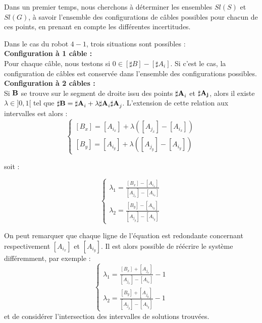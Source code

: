Dans un premier temps, nous cherchons \`a d\'eterminer les ensembles $Sl(S)$ et 
$Sl(G)$, \`a savoir l'ensemble des configurations de c\^ables possibles pour 
chacun de ces points, en prenant en compte les diff\'erentes incertitudes.

Dans le cas du robot $4-1$, trois situations sont possibles : \\

{\bf Configuration \`a 1 c\^able :}\\

Pour chaque c\^able, nous testons si $0 \in [\sharp B] - [\sharp A_i]$. Si 
c'est le cas, la configuration de c\^ables est conserv\'ee dans l'ensemble des 
configurations possibles.\\

{\bf Configuration \`a 2 c\^ables :}\\

Si ${\bf B}$ se trouve sur le segment de droite issu des points ${\bf 
\sharp A}_i$ et ${\bf \sharp A_j}$, alors il existe $\lambda \in ]0,1[$ tel que 
${\bf \sharp B} = {\bf \sharp A}_i + \lambda {\bf \sharp 
A}_i{\bf \sharp A}_j$.
L'extension de cette relation aux intervalles est alors :
\begin{equation}
\left \lbrace
\begin{matrix}
[B_x] = [A_{i_x}] + \lambda ([A_{j_x}] - [A_{i_x}]) \\
[B_y] = [A_{i_y}] + \lambda ([A_{j_y}] - [A_{i_y}])
\end{matrix}
\right .
\label{chap01:eq15}
\end{equation}

soit :

\begin{equation}
\left \lbrace
\begin{matrix}
\lambda_1 = \frac {[B_x] - [A_{i_x}]} {[A_{j_x}] - [A_{i_x}]}\\
\lambda_2 = \frac {[B_y] - [A_{i_y}]} {[A_{j_y}] - [A_{i_y}]}
\end{matrix}
\right .
\label{chap01:eq16}
\end{equation}

On peut remarquer que chaque ligne de l'\'equation est redondante concernant 
respectivement $[A_{i_x}]$ et $[A_{i_y}]$. Il est alors possible de 
r\'e\'ecrire le syst\`eme diff\'eremment, par exemple :
\begin{equation}
\left \lbrace
\begin{matrix}
\lambda_1 = \frac {[B_x] + [A_{j_x}]} {[A_{j_x}] - [A_{i_x}]} - 1\\
\lambda_2 = \frac {[B_y] + [A_{j_y}]} {[A_{j_y}] - [A_{i_y}]} - 1
\end{matrix}
\right .
\label{chap01:eq16}
\end{equation}
et de consid\'erer l'intersection des intervalles de solutions trouv\'ees.

